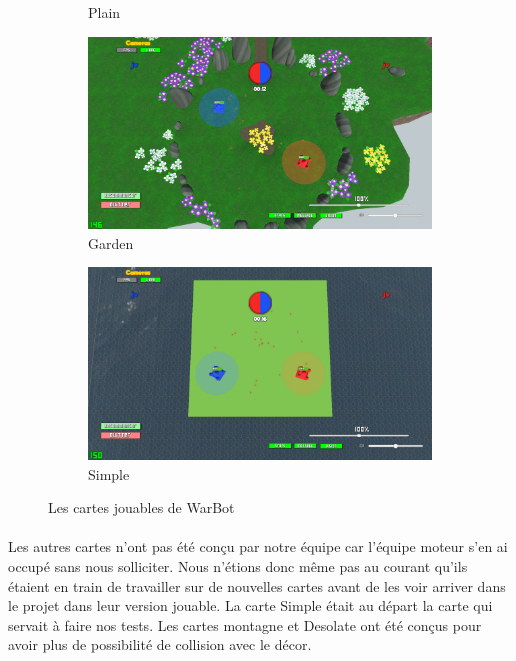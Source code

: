 \documentclass{report}
\begin{document}
\begin{figure}
\begin{adjustwidth}{-8em}{-7em}
\begin{subfigure}{.5\textwidth}
  \caption{Plain}
  \label{fig:sfig3}
\end{subfigure}
\newline
\begin{center}
\begin{subfigure}{.5\textwidth}
  \centering
  \includegraphics[scale=0.1]{DATA/jardin.png}
  \caption{Garden}
  \label{fig:sfig3}
\end{subfigure}
\begin{subfigure}{.5\textwidth}
  \centering
  \includegraphics[scale=0.1]{DATA/test.png}
  \caption{Simple}
  \label{fig:sfig3}
\end{subfigure}
\caption{Les cartes jouables de WarBot}
\label{fig:fig}
\end{center}
\end{adjustwidth}
\end{figure}
\paragraph{}

  Les autres cartes n’ont pas été conçu par notre équipe car l’équipe moteur s’en ai occupé sans nous solliciter. Nous n’étions donc même pas au courant qu’ils étaient en train de travailler sur de nouvelles cartes avant de les voir arriver dans le projet dans leur version jouable. La carte Simple était au départ la carte qui servait à faire nos tests. Les cartes montagne et Desolate ont été conçus pour avoir plus de possibilité de collision avec le décor.
\end{document}
